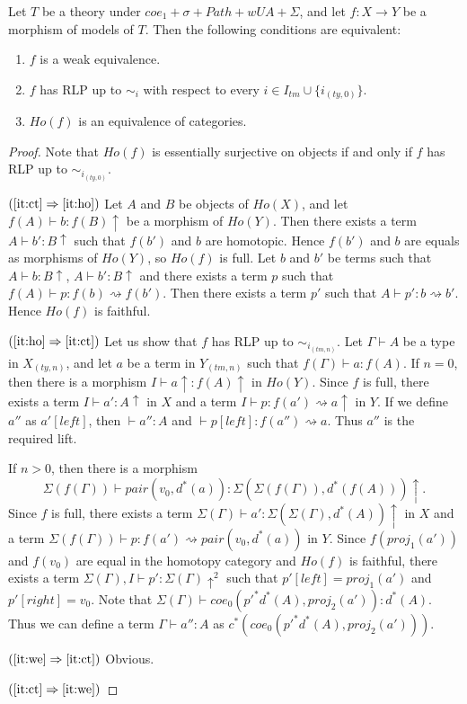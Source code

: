 \documentclass[reqno]{amsart}
\theoremstyle{definition}
\theoremstyle{remark}
\newcommand{\idtype}{\rightsquigarrow}
\numberwithin{figure}{section}
\begin{document}
\begin{prop}
Let $T$ be a theory under $coe_1 + \sigma + Path + wUA + \Sigma$, and let $f : X \to Y$ be a morphism of models of $T$.
Then the following conditions are equivalent:
\begin{enumerate}
\item \label{it:we} $f$ is a weak equivalence.
\item \label{it:ct} $f$ has RLP up to $\sim_i$ with respect to every $i \in I_{tm} \cup \{ i_{(ty,0)} \}$.
\item \label{it:ho} $Ho(f)$ is an equivalence of categories.
\end{enumerate}
\end{prop}
\begin{proof}
Note that $Ho(f)$ is essentially surjective on objects if and only if $f$ has RLP up to $\sim_{i_{(ty,0)}}$.

$(\ref{it:ct} \Rightarrow \ref{it:ho})$
Let $A$ and $B$ be objects of $Ho(X)$, and let $f(A) \vdash b : f(B)\!\uparrow$ be a morphism of $Ho(Y)$.
Then there exists a term $A \vdash b' : B\!\uparrow$ such that $f(b')$ and $b$ are homotopic.
Hence $f(b')$ and $b$ are equals as morphisms of $Ho(Y)$, so $Ho(f)$ is full.
Let $b$ and $b'$ be terms such that $A \vdash b : B\!\uparrow$, $A \vdash b' : B\!\uparrow$ and there exists a term $p$ such that $f(A) \vdash p : f(b) \idtype f(b')$.
Then there exists a term $p'$ such that $A \vdash p' : b \idtype b'$.
Hence $Ho(f)$ is faithful.

$(\ref{it:ho} \Rightarrow \ref{it:ct})$
Let us show that $f$ has RLP up to $\sim_{i_{(tm,n)}}$.
Let $\Gamma \vdash A$ be a type in $X_{(ty,n)}$, and let $a$ be a term in $Y_{(tm,n)}$ such that $f(\Gamma) \vdash a : f(A)$.
If $n = 0$, then there is a morphism $I \vdash a\!\uparrow : f(A)\!\uparrow$ in $Ho(Y)$.
Since $f$ is full, there exists a term $I \vdash a' : A\!\uparrow$ in $X$ and a term $I \vdash p : f(a') \idtype a\!\uparrow$ in $Y$.
If we define $a''$ as $a'[left]$, then $\vdash a'' : A$ and $\vdash p[left] : f(a'') \idtype a$.
Thus $a''$ is the required lift.

If $n > 0$, then there is a morphism
\[ \Sigma(f(\Gamma)) \vdash pair(v_0,d^*(a)) : \Sigma(\Sigma(f(\Gamma)),d^*(f(A)))\!\uparrow. \]
Since $f$ is full, there exists a term $\Sigma(\Gamma) \vdash a' : \Sigma(\Sigma(\Gamma),d^*(A))\!\uparrow$ in $X$ and
a term $\Sigma(f(\Gamma)) \vdash p : f(a') \idtype pair(v_0,d^*(a))$ in $Y$.
Since $f(proj_1(a'))$ and $f(v_0)$ are equal in the homotopy category and $Ho(f)$ is faithful,
there exists a term $\Sigma(\Gamma), I \vdash p' : \Sigma(\Gamma)\!\uparrow^2$ such that $p'[left] = proj_1(a')$ and $p'[right] = v_0$.
Note that $\Sigma(\Gamma) \vdash coe_0(p'^*d^*(A), proj_2(a')) : d^*(A)$.
Thus we can define a term $\Gamma \vdash a'' : A$ as $c^*(coe_0(p'^*d^*(A), proj_2(a')))$.

$(\ref{it:we} \Rightarrow \ref{it:ct})$ Obvious.

$(\ref{it:ct} \Rightarrow \ref{it:we})$
\end{proof}



\end{document}
